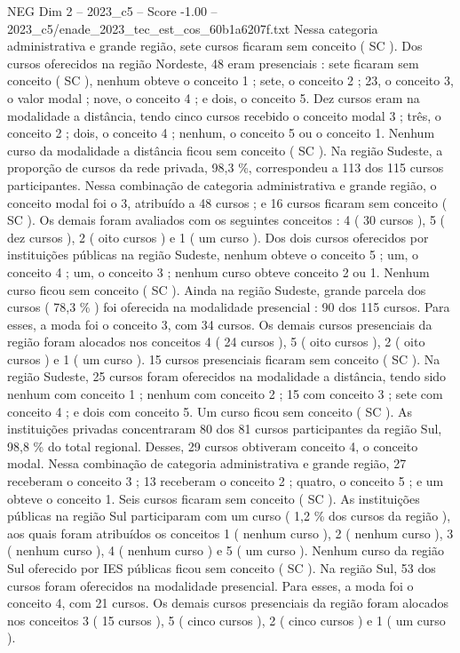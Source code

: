 \begin{textsample}{NEG Dim 2 – 2023\_c5 – Score -1.00 – 2023\_c5/enade\_2023\_tec\_est\_cos\_60b1a6207f.txt}
Nessa categoria administrativa e grande região, sete cursos ficaram sem conceito ( SC ).
Dos cursos oferecidos na região Nordeste, 48 eram presenciais : sete ficaram sem conceito ( SC ), nenhum obteve o conceito 1 ; sete, o conceito 2 ; 23, o conceito 3, o valor modal ; nove, o conceito 4 ; e dois, o conceito 5.
Dez cursos eram na modalidade a distância, tendo cinco cursos recebido o conceito modal 3 ; três, o conceito 2 ; dois, o conceito 4 ; nenhum, o conceito 5 ou o conceito 1.
Nenhum curso da modalidade a distância ficou sem conceito ( SC ).
Na região Sudeste, a proporção de cursos da rede privada, 98,3 \%, correspondeu a 113 dos 115 cursos participantes.
Nessa combinação de categoria administrativa e grande região, o conceito modal foi o 3, atribuído a 48 cursos ; e 16 cursos ficaram sem conceito ( SC ).
Os demais foram avaliados com os seguintes conceitos : 4 ( 30 cursos ), 5 ( dez cursos ), 2 ( oito cursos ) e 1 ( um curso ).
Dos dois cursos oferecidos por instituições públicas na região Sudeste, nenhum obteve o conceito 5 ; um, o conceito 4 ; um, o conceito 3 ; nenhum curso obteve conceito 2 ou 1.
Nenhum curso ficou sem conceito ( SC ).
Ainda na região Sudeste, grande parcela dos cursos ( 78,3 \% ) foi oferecida na modalidade presencial : 90 dos 115 cursos.
Para esses, a moda foi o conceito 3, com 34 cursos.
Os demais cursos presenciais da região foram alocados nos conceitos 4 ( 24 cursos ), 5 ( oito cursos ), 2 ( oito cursos ) e 1 ( um curso ). 15 cursos presenciais ficaram sem conceito ( SC ).
Na região Sudeste, 25 cursos foram oferecidos na modalidade a distância, tendo sido nenhum com conceito 1 ; nenhum com conceito 2 ; 15 com conceito 3 ; sete com conceito 4 ; e dois com conceito 5.
Um curso ficou sem conceito ( SC ).
As instituições privadas concentraram 80 dos 81 cursos participantes da região Sul, 98,8 \% do total regional.
Desses, 29 cursos obtiveram conceito 4, o conceito modal.
Nessa combinação de categoria administrativa e grande região, 27 receberam o conceito 3 ; 13 receberam o conceito 2 ; quatro, o conceito 5 ; e um obteve o conceito 1.
Seis cursos ficaram sem conceito ( SC ).
As instituições públicas na região Sul participaram com um curso ( 1,2 \% dos cursos da região ), aos quais foram atribuídos os conceitos 1 ( nenhum curso ), 2 ( nenhum curso ), 3 ( nenhum curso ), 4 ( nenhum curso ) e 5 ( um curso ).
Nenhum curso da região Sul oferecido por IES públicas ficou sem conceito ( SC ).
Na região Sul, 53 dos cursos foram oferecidos na modalidade presencial.
Para esses, a moda foi o conceito 4, com 21 cursos.
Os demais cursos presenciais da região foram alocados nos conceitos 3 ( 15 cursos ), 5 ( cinco cursos ), 2 ( cinco cursos ) e 1 ( um curso ).

\end{textsample}
